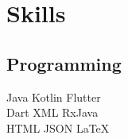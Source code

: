 \documentclass[]{deedy-resume-openfont}
\begin{document}
\begin{minipage}[t]{0.33\textwidth}
\sectionsep


\section{Skills}
\subsection{Programming}
Java \textbullet{} Kotlin \textbullet{} Flutter \\ Dart  \textbullet{} XML \textbullet{} RxJava \\ HTML \textbullet{} JSON \textbullet{} LaTeX\ \\ 
\sectionsep

%
%

\end{minipage} 
\hfill
\end{document}
